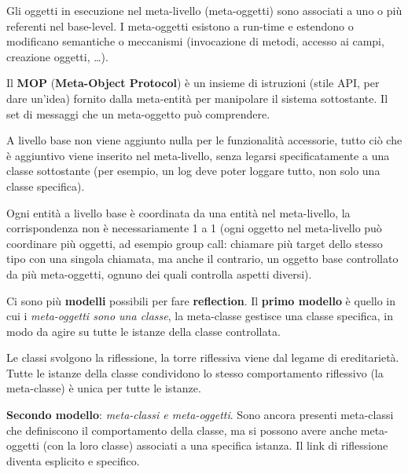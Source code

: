 Gli oggetti in esecuzione nel meta-livello (meta-oggetti) sono associati a uno o più referenti nel base-level. I meta-oggetti esistono a run-time e estendono o modificano semantiche o meccanismi (invocazione di metodi, accesso ai campi, creazione oggetti, \dots).

Il \textbf{MOP} (\textbf{Meta-Object Protocol}) è un insieme di istruzioni (stile API, per dare un'idea) fornito dalla meta-entità per manipolare il sistema sottostante. Il set di messaggi che un meta-oggetto può comprendere.

%	
%
%

A livello base non viene aggiunto nulla per le funzionalità accessorie, tutto ciò che è aggiuntivo viene inserito nel meta-livello, senza legarsi specificatamente a una classe sottostante (per esempio, un log deve poter loggare tutto, non solo una classe specifica).

Ogni entità a livello base è coordinata da una entità nel meta-livello, la corrispondenza non è necessariamente 1 a 1 (ogni oggetto nel meta-livello può coordinare più oggetti, ad esempio group call: chiamare più target dello stesso tipo con una singola chiamata, ma anche il contrario, un oggetto base controllato da più meta-oggetti, ognuno dei quali controlla aspetti diversi).

Ci sono più \textbf{modelli} possibili per fare \textbf{reflection}. Il \textbf{primo modello} è quello in cui i \textit{meta-oggetti sono una classe}, la meta-classe gestisce una classe specifica, in modo da agire su tutte le istanze della classe controllata. 

Le classi svolgono la riflessione, la torre riflessiva viene dal legame di ereditarietà. Tutte le istanze della classe condividono lo stesso comportamento riflessivo (la meta-classe) è unica per tutte le istanze.

\textbf{Secondo modello}: \textit{meta-classi e meta-oggetti}. Sono ancora presenti meta-classi che definiscono il comportamento della classe, ma si possono avere anche meta-oggetti (con la loro classe) associati a una specifica istanza. Il link di riflessione diventa esplicito e specifico.

